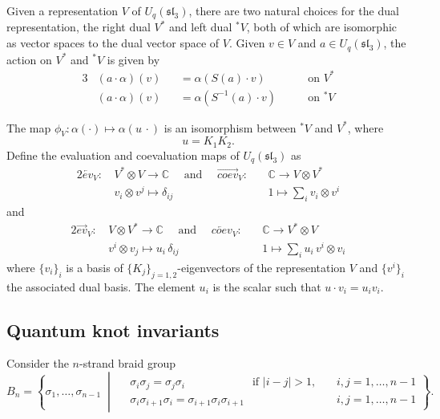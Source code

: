 \documentclass[12pt,oneside,reqno]{amsart}
\def\C{\mathbb{C}}
\numberwithin{teorema}{section}
\numberwithin{definicion}{section}
\numberwithin{lema}{section}
\numberwithin{conjetura}{section}
\numberwithin{proposicion}{section}
\def\sl{\mathfrak{sl}}
\def\Uq{U_q}
\begin{document}
Given a representation $V$ of $\Uq(\sl_3)$, there are two natural choices for the dual representation, the right dual $V^*$ and left dual ${}^*V$, both of which are isomorphic as vector spaces to the dual vector space of $V$. Given $v\in V$ and $a\in\Uq(\sl_3)$, the action on $V^*$ and ${}^*V$ is given by
\begin{alignat*}{3}
    &(a\cdot \alpha)(v) &&= \alpha(S(a)\cdot v) \hspace{2em} &\text{on } V^*\\
    &(a\cdot \alpha)(v) &&= \alpha(S^{-1}(a)\cdot v) \hspace{2em} & \text{on } {}^*V 
\end{alignat*}

The map $\phi_V:\alpha(\cdot)\mapsto \alpha(u\,\cdot)$ is an isomorphism between ${}^*V$ and $V^*$, where 
\begin{equation*}
    u = K_1K_2.
\end{equation*}
Define the evaluation and coevaluation maps of $\Uq(\sl_3)$ as
\begin{alignat*}{2}
    \overleftarrow{ev}_V:\,&V^*\otimes V\rightarrow \C \hspace{1em}\text{ and }\hspace{1em} \overrightarrow{coev}_V:\,&&\C \rightarrow V\otimes V^* \\
    &v_i\otimes v^j\mapsto \delta_{ij} && 1\mapsto \sum_i v_i\otimes v^i
\end{alignat*}
and
\begin{alignat*}{2}
    \overrightarrow{ev}_V:\,&V\otimes V^*\rightarrow \C \hspace{1em}\text{ and }\hspace{1em} \overleftarrow{coev}_V:\,&&\C \rightarrow V^*\otimes V \\
    &v^i\otimes v_j\mapsto u_i\,\delta_{ij} && 1\mapsto \sum_i u_i\,v^i\otimes v_i
\end{alignat*}
where $\{v_i\}_i$ is a basis of $\{K_j\}_{j=1,2}$-eigenvectors of the representation $V$ and $\{v^i\}_i$ the associated dual basis. The element $u_i$ is the scalar such that $u\cdot v_i = u_i v_i$.

\subsection{Quantum knot invariants}

Consider the $n$-strand braid group
\begin{equation*}\label{eq:Bn}
    B_n = \left\{ \sigma_1, \dots, \sigma_{n-1} \;\middle|\;
    \begin{alignedat}{2}
        &\sigma_i\sigma_j = \sigma_j\sigma_i \hspace{6em} \text{if } |i-j|>1, \, &&i,j=1,\dots,n-1 \\
        &\sigma_{i}\sigma_{i+1}\sigma_i=\sigma_{i+1}\sigma_{i}\sigma_{i+1} &&i,j=1,\dots,n-1
    \end{alignedat}
    \right\}.
\end{equation*}
\end{document}
